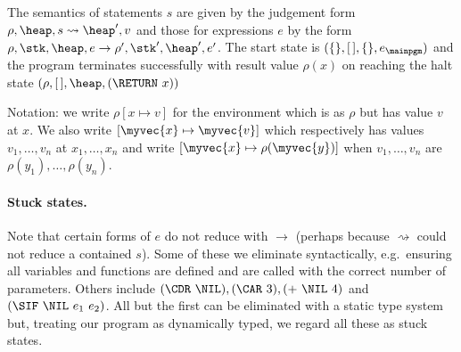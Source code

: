 The semantics 
of statements $s$ are given by the judgement form
$\rho, \heap, s \rightsquigarrow \heap', v$
and those for expressions $e$ by the form
$\rho, \stk, \heap, e \rightarrow \rho', \stk', \heap', e'$.
The start state is $(\{\},[\,], \{\}, e_\mainpgm)$ and the
program terminates successfully with result value $\rho(x)$
on reaching the halt state $(\rho,[\,], \heap, (\RETURN\ x))$

Notation:  we write $\rho[x \mapsto v]$ for the environment which is
as $\rho$ but has value $v$ at $x$.
We also write $[\myvec{x} \mapsto \myvec{v}]$ which respectively
has values $v_1, \ldots, v_n$ at $x_1, \ldots, x_n$ and write
$[\myvec{x} \mapsto \rho(\myvec{y})]$ when 
$v_1, \ldots, v_n$ are $\rho(y_1), \ldots, \rho(y_n)$.

\paragraph{Stuck states.} Note that certain forms of $e$ do not reduce
with $\rightarrow$ (perhaps because $\rightsquigarrow$ could not reduce
a contained $s$).  Some of these we eliminate syntactically, e.g.\
ensuring all variables and functions are defined and are called with
the correct number of parameters.
Others include $(\CDR\ \NIL), (\CAR\ 3), (+\ \NIL\ 4)$ and $(\SIF\ \NIL\ e_1\ e_2)$.
All but the first can be eliminated with a static type system but,
treating our program as dynamically typed, we regard all these
as stuck states.




